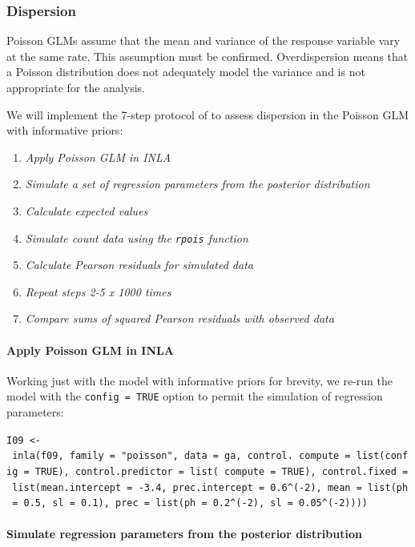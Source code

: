 \documentclass[
]{book}
\begin{document}
\hypertarget{pois-disp}{%
\subsubsection{Dispersion}\label{pois-disp}}

Poisson GLMs assume that the mean and variance of the response variable vary at the same rate. This assumption must be confirmed. Overdispersion means that a Poisson distribution does not adequately model the variance and is not appropriate for the analysis.

We will implement the 7-step protocol of \citet{Zuur_2017} to assess dispersion in the Poisson GLM with informative priors:

\begin{enumerate}
\def\labelenumi{\arabic{enumi}.}
\item
  \emph{Apply Poisson GLM in INLA}
\item
  \emph{Simulate a set of regression parameters from the posterior distribution}
\item
  \emph{Calculate expected values}
\item
  \emph{Simulate count data using the \texttt{rpois} function}
\item
  \emph{Calculate Pearson residuals for simulated data}
\item
  \emph{Repeat steps 2-5 x 1000 times}
\item
  \emph{Compare sums of squared Pearson residuals with observed data}
\end{enumerate}

\hypertarget{pois-sim}{%
\paragraph{Apply Poisson GLM in INLA}\label{pois-sim}}

Working just with the model with informative priors for brevity, we re-run the model with the \texttt{config\ =\ TRUE} option to permit the simulation of regression parameters:

\texttt{I09\ \textless{}-\ inla(f09,\ family\ =\ "poisson",\ data\ =\ ga,\ control.\ compute\ =\ list(config\ =\ TRUE),\ control.predictor\ =\ list(\ compute\ =\ TRUE),\ control.fixed\ =\ list(mean.intercept\ =\ -3.4,\ prec.intercept\ =\ 0.6\^{}(-2),\ mean\ =\ list(ph\ =\ 0.5,\ sl\ =\ 0.1),\ prec\ =\ list(ph\ =\ 0.2\^{}(-2),\ sl\ =\ 0.05\^{}(-2))))}

\hypertarget{simulate-regression-parameters-from-the-posterior-distribution}{%
\paragraph{Simulate regression parameters from the posterior distribution}\label{simulate-regression-parameters-from-the-posterior-distribution}}
\end{document}
